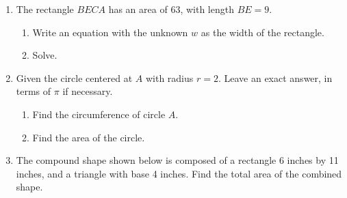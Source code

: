 \documentclass[12pt, twoside]{article}
\begin{document}
\begin{enumerate}
\item The rectangle $BECA$ has an area of 63, with length $BE=9$.
\begin{enumerate}
  \item Write an equation with the unknown $w$ as the width of the rectangle.\\[0.5cm]
  \item Solve.
\end{enumerate}
\begin{flushright}
\end{flushright}

\item Given the circle centered at $A$ with radius $r=2$. Leave an exact answer, in terms of $\pi$ if necessary.
  \begin{multicols}{2}
    \begin{enumerate}
      \item Find the circumference of circle $A$. %
      \item Find the area of the circle.\vspace{2cm}
    \end{enumerate}
    \begin{flushright}
  \end{flushright}
  \end{multicols}

\item The compound shape shown below is composed of a rectangle 6 inches by 11 inches, and a triangle with base 4 inches. Find the total area of the combined shape.
    \vspace{0.5cm} 
    \begin{flushleft}
    \end{flushleft}


\end{enumerate}
\end{document}
